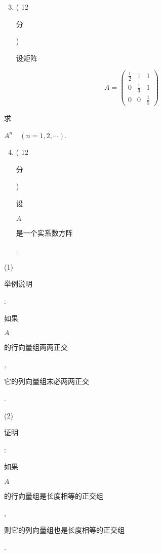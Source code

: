 \documentclass[10pt]{article}
\begin{document}
\begin{enumerate}
  \setcounter{enumi}{2}
  \item ( 12 \begin{CJK}{UTF8}{mj}分\end{CJK}) \begin{CJK}{UTF8}{mj}设矩阵\end{CJK}
\end{enumerate}
$$
A=\left(\begin{array}{ccc}
\frac{1}{2} & 1 & 1 \\
0 & \frac{1}{3} & 1 \\
0 & 0 & \frac{1}{5}
\end{array}\right)
$$
\begin{CJK}{UTF8}{mj}求\end{CJK} $A^{n} \quad(n=1,2, \cdots)$.

\begin{enumerate}
  \setcounter{enumi}{3}
  \item ( 12 \begin{CJK}{UTF8}{mj}分\end{CJK}) \begin{CJK}{UTF8}{mj}设\end{CJK} $A$ \begin{CJK}{UTF8}{mj}是一个实系数方阵\end{CJK}.
\end{enumerate}
(1) \begin{CJK}{UTF8}{mj}举例说明\end{CJK}: \begin{CJK}{UTF8}{mj}如果\end{CJK} $A$ \begin{CJK}{UTF8}{mj}的行向量组两两正交\end{CJK}, \begin{CJK}{UTF8}{mj}它的列向量组末必两两正交\end{CJK}.

(2) \begin{CJK}{UTF8}{mj}证明\end{CJK}: \begin{CJK}{UTF8}{mj}如果\end{CJK} $A$ \begin{CJK}{UTF8}{mj}的行向量组是长度相等的正交组\end{CJK}, \begin{CJK}{UTF8}{mj}则它的列向量组也是长度相等的正交组\end{CJK}.
\end{document}
